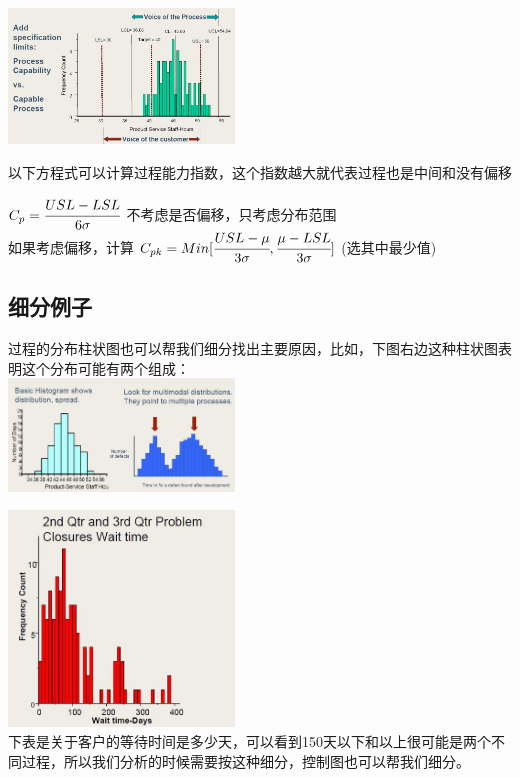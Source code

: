 \includegraphics[width=6cm]{DAD_p57.jpg}

以下方程式可以计算过程能力指数，这个指数越大就代表过程也是中间和没有偏移




\(C_p = \cfrac{USL - LSL}{6 \sigma}\) 不考虑是否偏移，只考虑分布范围\\
如果考虑偏移，计算
\(C_{pk} = Min [ \cfrac{USL - \mu}{3 \sigma} , \cfrac{\mu - LSL}{3 \sigma} ]\)
(选其中最少值)\\

\hypertarget{ux7ec6ux5206ux4f8bux5b50}{%
\subsection{细分例子}\label{ux7ec6ux5206ux4f8bux5b50}}

过程的分布柱状图也可以帮我们细分找出主要原因，比如，下图右边这种柱状图表明这个分布可能有两个组成：\\

\includegraphics[width=6cm]{DAD_p55.jpg}


\includegraphics[width=6cm]{DAD_p591.jpg}\\
下表是关于客户的等待时间是多少天，可以看到150天以下和以上很可能是两个不同过程，所以我们分析的时候需要按这种细分，控制图也可以帮我们细分。

